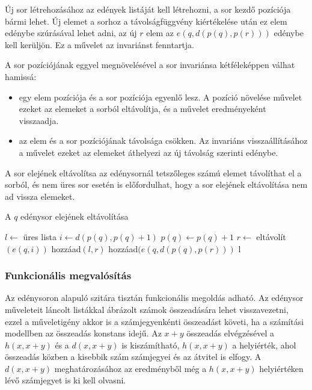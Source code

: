 Új sor létrehozásához az edények listáját kell létrehozni, a sor kezdő pozíciója bármi lehet.
Új elemet a sorhoz a távolságfüggvény kiértékelése után ez elem edénybe szúrásával lehet adni,
az új $r$ elem az $e(q, d(p(q), p(r)))$ edénybe kell kerüljön.
Ez a művelet az invariánst fenntartja.

A sor pozíciójának eggyel megnövelésével a sor invariánsa kétféleképpen válhat hamissá:
\begin{itemize}
\item egy elem pozíciója és a sor pozíciója egyenlő lesz. A pozíció növelése művelet ezeket az elemeket a sorból eltávolítja, és a művelet eredményeként visszaadja.
\item az elem és a sor pozíciójának távolsága csökken. Az invariáns visszaállításához a művelet ezeket az elemeket áthelyezi az új távolság szerinti edénybe.
\end{itemize}
A sor elejének eltávolítsa az edénysornál tetszőleges számú elemet távolíthat el a sorból, és nem üres sor esetén is előfordulhat, hogy a sor elejének eltávolítása nem ad vissza elemeket.

\begin{algorithm}[H]
\caption{A $q$ edénysor elejének eltávolítása}
\label{alg:buckets-remove-min}
\begin{algorithmic}[1]
	\State $l \gets$ üres lista
	\State $i \gets d(p(q), p(q)+1)$
	\State $p(q) \gets p(q)+1$
		\State $r \gets$ eltávolít$(e(q, i))$
			\State hozzáad$(l, r)$
		\Else
			\State hozzáad$(e(q, d(p(q), p(r)))$
		\EndIf
	\EndWhile
	\State \Return l
\EndFunction
\end{algorithmic}
\end{algorithm}

\subsubsection{Funkcionális megvalósítás}

Az edénysoron alapuló szitára tisztán funkcionális megoldás adható.
Az edénysor műveleteit láncolt listákkal ábrázolt számok összeadására lehet visszavezetni,
ezzel a műveletigény akkor is a számjegyenkénti összeadást követi, ha a számítási modellben az összeadás konstans idejű.
Az $x+y$ összeadás elvégzésével a $h(x, x+y)$ és a $d(x, x+y)$ is kiszámítható, $h(x, x+y)$ a helyiérték, ahol összeadás közben a kisebbik szám számjegyei és az átvitel is elfogy. A $d(x, x+y)$ meghatározásához az eredményből még a $h(x, x+y)$ helyiértéken lévő számjegyet is ki kell olvasni.

